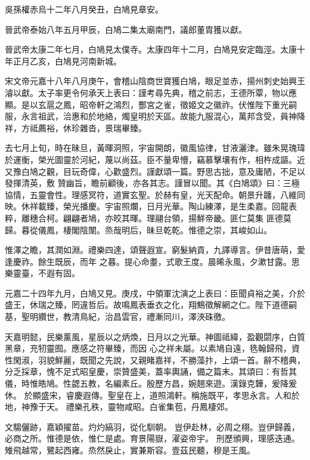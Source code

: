 \begin{pinyinscope}
 吳孫權赤烏十二年八月癸丑，白鳩見章安。



 晉武帝泰始八年五月甲辰，白鳩二集太廟南門，議郎董胄獲以獻。



 晉武帝太康二年七月，白鳩見太僕寺。太康四年十二月，白鳩見安定臨涇。太康十年正月乙亥，白鳩見河南新城。



 宋文帝元嘉十八年八月庚午，會稽山陰商世寶獲白鳩，眼足並赤，揚州刺史始興王濬以獻。太子率更令何承天上表曰：謹考尋先典，稽之前志，王德所覃，物以應
 顯。是以玄扈之鳳，昭帝軒之鴻烈，酆宮之雀，徵姬文之徽祚。伏惟陛下重光嗣服，永言祖武，洽惠和於地絡，燭皇明於天區。故能九服混心，萬邦含受，員神降祥，方祗薦裕，休珍雜沓，景瑞畢臻。


去七月上旬，時在昧旦，黃暉洞照，宇宙開朗，徽風協律，甘液灑津。雖朱晃瑰瑋於運衡，榮光圖靈於河紀，蔑以尚茲。臣不量卑懵，竊慕擊壤有作，相杵成謳。近又豫白鳩之觀，目玩奇偉，心歡盛烈。謹獻頌一篇。野思古拙，意及庸陋，不足以發揮清英，敷
 贊幽旨，瞻前顧後，亦各其志。謹冒以聞。其《白鳩頌》曰：三極協情，五靈會性。理感冥符，道實玄聖。於赫有皇，光天配命。朝景升躔，八維同映。休祥載臻，榮光播慶。宇宙照爛，日月光華。陶山練澤，是生柔嘉。回龍表粹，離穗合柯。翩翩者鳩，亦皎其暉。理翮台領，揚鮮帝畿。匪仁莫集
 匪德莫歸。暮從儀鳳，棲閣陰闈。烝哉明后，昧旦乾乾。惟德之崇，其峻如山。



 惟澤之瞻，其潤如淵。禮樂四達，頌聲遐宣。窮髮納貢，九譯導言。伊昔唐萌，愛逢慶祚。餘生既辰，而年
 之暮。提心命耋，式歌王度。晨晞永風，夕漱甘露。思樂靈臺，不遐有固。



 元嘉二十四年九月，白鳩又見。庚戌，中領軍沈演之上表曰：臣聞貞裕之美，介於盛王，休瑞之臻，罔違哲后。故鳴鳳表垂衣之化，翔鷦徵解網之仁。陛下道德嗣基，聖明纘世，教清鳥紀，治昌雲官，禮漸同川，澤浹硃徼。


天嘉明懿，民樂薰風，星辰以之炳煥，日月以之光華。神圖祗緯，盈觀閟序，白質黑章，充牣靈囿。應感之符畢臻，而因
 心之祥未屬。以素鳩自遠，毨翰歸飛，資性閑淑，羽貌鮮麗，既聞之先說，又親睹嘉祥，不勝藻抃，上頌一首。辭不稽典，分乏採章，愧不足式昭皇慶，崇贊盛美，蓋率輿誦，備之篇末。其頌曰：有哲其儀，時惟皓鳩。性勰五教，名編素丘。殷歷方昌，婉翹來遊。漢錄克韡，爰降爰休。
 於顯盛宋，睿慶遐傳。聖皇在上，道照鴻軒。稱施既平，孝思永言。人和於地，神豫于天。
 禮樂孔秩，靈物咸昭。白雀集苞，丹鳳棲郊。


文騶儷跡，嘉穎擢苗。灼灼縞羽，從化馴朝。
 豈伊赴林，必周之栩。豈伊歸義，必商之所。惟德是依，惟仁是處。育景陽嶽，濯姿帝宇。
 刑歷頒興，理感迭通。雉飛越常，鷺起西雍。烝然戾止，實兼斯容。壹茲民聽，穆是王風。



\end{pinyinscope}
